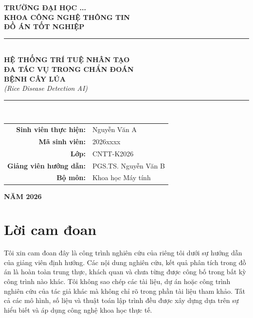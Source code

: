 \documentclass[13pt,a4paper]{extreport}
\begin{document}

\begin{titlepage}
\begin{center}
    \vspace*{0.5cm}
    {\large \textbf{TRƯỜNG ĐẠI HỌC ...}} \\[0.2cm]
    {\large \textbf{KHOA CÔNG NGHỆ THÔNG TIN}} \\[2cm]
    {\Huge \textbf{ĐỒ ÁN TỐT NGHIỆP}} \\[1cm]
    \rule{\textwidth}{1.5pt} \\[0.5cm]
    {\LARGE \textbf{HỆ THỐNG TRÍ TUỆ NHÂN TẠO}} \\[0.3cm]
    {\LARGE \textbf{ĐA TÁC VỤ TRONG CHẨN ĐOÁN}} \\[0.3cm]
    {\LARGE \textbf{BỆNH CÂY LÚA}} \\[0.3cm]
    {\large \textit{(Rice Disease Detection AI)}} \\[0.5cm]
    \rule{\textwidth}{1.5pt} \\[2cm]

    \begin{tabular}{rl}
        \textbf{Sinh viên thực hiện:} & Nguyễn Văn A \\[0.3cm]
        \textbf{Mã sinh viên:}        & 2026xxxx \\[0.3cm]
        \textbf{Lớp:}                 & CNTT-K2026 \\[0.3cm]
        \textbf{Giảng viên hướng dẫn:} & PGS.TS. Nguyễn Văn B \\[0.3cm]
        \textbf{Bộ môn:}              & Khoa học Máy tính \\
    \end{tabular}
    \vfill
    {\large \textbf{NĂM 2026}}
\end{center}
\end{titlepage}

\chapter*{Lời cam đoan}
Tôi xin cam đoan đây là công trình nghiên cứu của riêng tôi dưới sự hướng dẫn của giảng viên định hướng. Các nội dung nghiên cứu, kết quả phân tích trong đồ án là hoàn toàn trung thực, khách quan và chưa từng được công bố trong bất kỳ công trình nào khác. Tôi không sao chép các tài liệu, dự án hoặc công trình nghiên cứu của tác giả khác mà không chỉ rõ trong phần tài liệu tham khảo. Tất cả các mô hình, số liệu và thuật toán lập trình đều được xây dựng dựa trên sự hiểu biết và áp dụng công nghệ khoa học thực tế.
\end{document}
